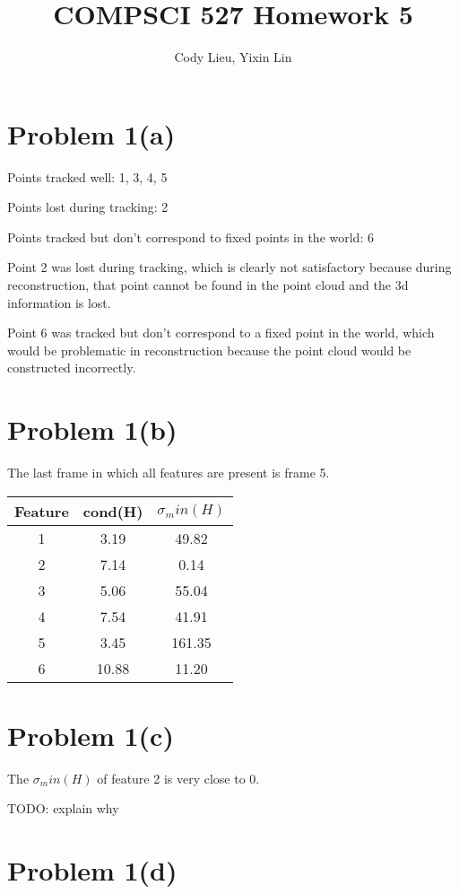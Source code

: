 \documentclass{article}
\author{Cody Lieu, Yixin Lin}
\title{COMPSCI 527 Homework 5}
\begin{document}
\maketitle

\section*{Problem 1(a)}

Points tracked well: 1, 3, 4, 5

Points lost during tracking: 2

Points tracked but don't correspond to fixed points in the world: 6

Point 2 was lost during tracking, which is clearly not satisfactory because during reconstruction, that point cannot be found in the point cloud and the 3d information is lost.

Point 6 was tracked but don't correspond to a fixed point in the world, which would be problematic in reconstruction because the point cloud would be constructed incorrectly.

\section*{Problem 1(b)}

The last frame in which all features are present is frame 5.

\begin{center}
\begin{tabular}{ ||c|c|c|| } 
	\hline
	Feature & cond(H) & $\sigma_min(H)$ \\ \hline
 	1 &3.19 &49.82 \\ 
	2 &7.14 &0.14 \\
	3 &5.06 &55.04 \\
	4 &7.54 &41.91 \\
	5 &3.45 &161.35 \\
	6 &10.88 &11.20 \\
\hline
\end{tabular}
\end{center}

\section*{Problem 1(c)}
The $\sigma_min(H)$ of feature 2 is very close to 0.

TODO: explain why

\section*{Problem 1(d)}
\end{document}

